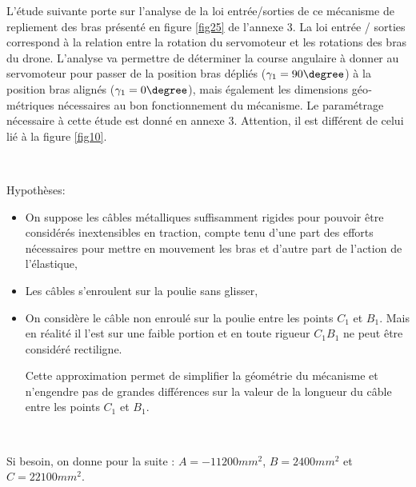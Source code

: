 L'étude suivante porte sur l'analyse de la loi entrée/sorties de ce mécanisme de repliement des bras présenté en figure \ref{fig25} de l'annexe 3. La loi entrée / sorties correspond à la relation entre la rotation du servomoteur et les rotations des bras du drone. L'analyse va permettre de déterminer la course angulaire à donner au servomoteur pour passer de la position bras dépliés ($\gamma_1=90\degree$) à la position bras alignés ($\gamma_1=0\degree$), mais également les dimensions géo­métriques nécessaires au bon fonctionnement du mécanisme. Le paramétrage nécessaire à cette étude est donné en annexe 3. Attention, il est différent de celui lié à la figure \ref{fig10}.

~\

Hypothèses:
\begin{itemize}
 \item ­On suppose les câbles métalliques suffisamment rigides pour pouvoir être considérés inextensibles en traction, compte tenu d'une part des efforts nécessaires pour mettre en mouvement les bras et d'autre part de l'action de l'élastique,
 \item Les câbles s'enroulent sur la poulie sans glisser,
­ \item On considère le câble non enroulé sur la poulie entre les points $C_1$ et $B_1$. Mais en réalité il l'est sur une faible portion et en toute rigueur $C_1B_1$ ne peut être considéré rectiligne.

Cette approximation permet de simplifier la géométrie du mécanisme et n'engendre
pas de grandes différences sur la valeur de la longueur du câble entre les points $C_1$ et $B_1$.
\end{itemize}

\newpage




~\

Si besoin, on donne pour la suite : $A=-11200mm^2$, $B=2400mm^2$ et $C=22100mm^2$.



